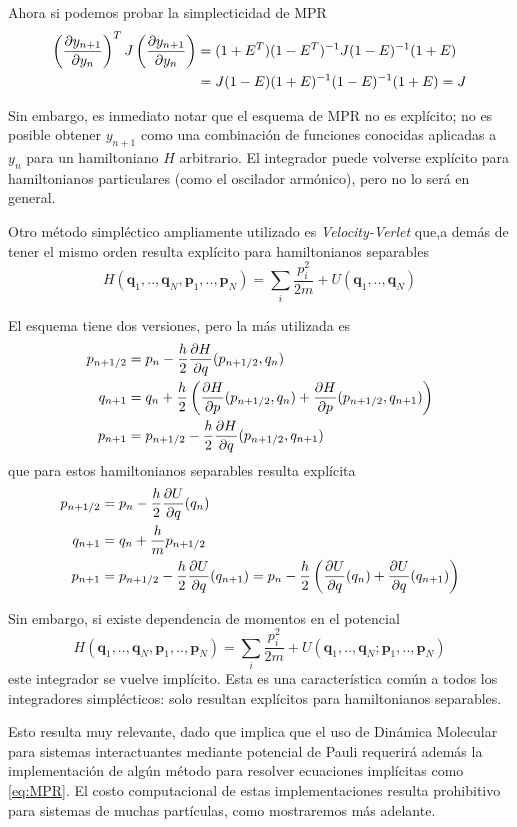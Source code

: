 Ahora si podemos probar la simplecticidad de MPR
\begin{align*}
\left(\frac{\partial y_{n+1}}{\partial y_n}\right)^TJ\left(\frac{\partial y_{n+1}}{\partial y_n}\right) &= (1+E^T)(1-E^T)^{-1}J(1-E)^{-1}(1+E) \\
&= J(1-E)(1+E)^{-1}(1-E)^{-1}(1+E) = J
\end{align*}


Sin embargo, es inmediato notar que el esquema de MPR no es explícito; no es posible obtener $y_{n+1}$ como una combinación de funciones conocidas aplicadas a $y_n$ para un hamiltoniano $H$ arbitrario.
El integrador puede volverse explícito para hamiltonianos particulares (como el oscilador armónico), pero no lo será en general.

Otro método simpléctico ampliamente utilizado es \textit{Velocity-Verlet} que,a demás de tener el mismo orden resulta explícito para hamiltonianos separables
\[ H(\mathbf{q}_1,..,\mathbf{q}_N,\mathbf{p}_1,..,\mathbf{p}_N) = \sum_i \frac{p_i^2}{2m} + U(\mathbf{q}_1,..,\mathbf{q}_N)\]

El esquema tiene dos versiones, pero la más utilizada es
\begin{align*}
 p_{n+1/2} &= p_n - \frac{h}{2}\frac{\partial H}{\partial q}(p_{n+1/2}, q_n) \\
 q_{n+1} &= q_n + \frac{h}{2}\left( \frac{\partial H}{\partial p}(p_{n+1/2}, q_n) + \frac{\partial H}{\partial p}(p_{n+1/2}, q_{n+1}) \right) \\
 p_{n+1} &= p_{n+1/2} - \frac{h}{2}\frac{\partial H}{\partial q}(p_{n+1/2}, q_{n+1})
\end{align*}
que para estos hamiltonianos separables resulta explícita
\begin{align*}
 p_{n+1/2} &= p_n - \frac{h}{2}\frac{\partial U}{\partial q}(q_n) \\
 q_{n+1} &= q_n + \frac{h}{m}p_{n+1/2} \\
 p_{n+1} &= p_{n+1/2} - \frac{h}{2}\frac{\partial U}{\partial q}(q_{n+1}) = p_n - \frac{h}{2} \left( \frac{\partial U}{\partial q}(q_n) + \frac{\partial U}{\partial q}(q_{n+1}) \right)
\end{align*}

Sin embargo, si existe dependencia de momentos en el potencial
\[ H(\mathbf{q}_1,..,\mathbf{q}_N,\mathbf{p}_1,..,\mathbf{p}_N) = \sum_i \frac{p_i^2}{2m} + U(\mathbf{q}_1,..,\mathbf{q}_N;\mathbf{p}_1,..,\mathbf{p}_N)\]
este integrador se vuelve implícito.
Esta es una característica común a todos los integradores simplécticos: solo resultan explícitos para hamiltonianos separables.

Esto resulta muy relevante, dado que implica que el uso de Dinámica Molecular para sistemas interactuantes mediante potencial de Pauli requerirá además la implementación
de algún método para resolver ecuaciones implícitas como \eqref{eq:MPR}.
El costo computacional de estas implementaciones resulta prohibitivo para sistemas de muchas partículas, como mostraremos más adelante.

